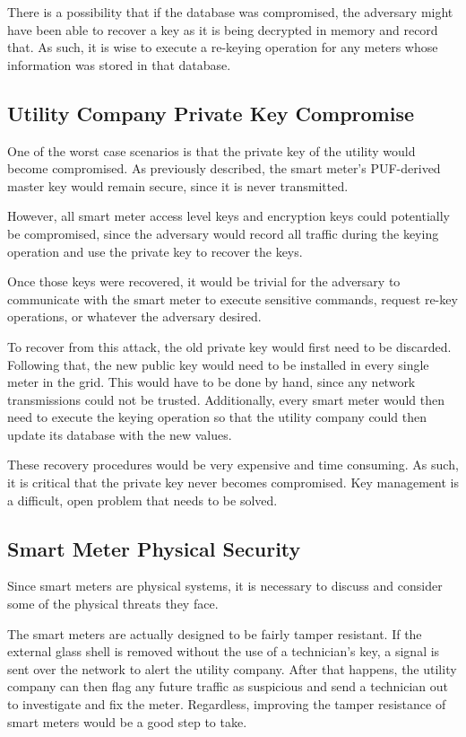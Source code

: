 There is a possibility that if the database was compromised, the adversary might have been able to recover a key
as it is being decrypted in memory and record that. As such, it is wise to execute a re-keying operation for any meters
whose information was stored in that database.

\subsection{Utility Company Private Key Compromise}
One of the worst case scenarios is that the private key of the utility would become compromised. As previously
described, the smart meter's PUF-derived master key would remain secure, since it is never transmitted.

However, all smart meter access level keys and encryption keys could potentially be compromised, since the adversary
would record all traffic during the keying operation and use the private key to recover the keys.

Once those keys were recovered, it would be trivial for the adversary to communicate with the smart meter to
execute sensitive commands, request re-key operations, or whatever the adversary desired.

To recover from this attack, the old private key would first need to be discarded. Following that, the new public key would
need to be installed in every single meter in the grid. This would have to be done by hand, since any network
transmissions could not be trusted. Additionally, every smart meter would then need to execute the keying operation
so that the utility company could then update its database with the new values.

These recovery procedures would be very expensive and time consuming. As such, it is critical that the private key
never becomes compromised. Key management is a difficult, open problem that needs to be solved.

\subsection{Smart Meter Physical Security}
Since smart meters are physical systems, it is necessary to discuss and consider some of the physical threats they face.

The smart meters are actually designed to be fairly tamper resistant. If the external glass shell is removed without the
use of a technician's key, a signal is sent over the network to alert the utility company. After that happens, the utility
company can then flag any future traffic as suspicious and send a technician out to investigate and fix the meter.
Regardless, improving the tamper resistance of smart meters would be a good step to take.

